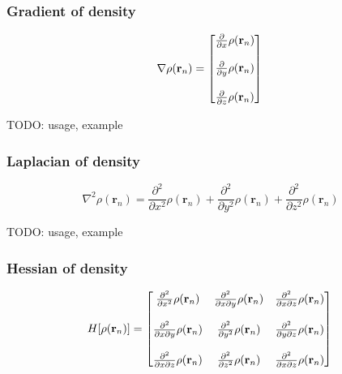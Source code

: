 \documentclass[letterpaper]{article}
\begin{document}
\subsubsection{Gradient of density}
\begin{equation}
  \nabla \rho(\mathbf{r}_n)
  =
  \begin{bmatrix}
    \frac{\partial}{\partial x} \rho(\mathbf{r}_n)\\\\
    \frac{\partial}{\partial y} \rho(\mathbf{r}_n)\\\\
    \frac{\partial}{\partial z} \rho(\mathbf{r}_n)
  \end{bmatrix}\\
\end{equation}

TODO: usage, example
\subsubsection{Laplacian of density}
\begin{equation}
  \nabla^2 \rho(\mathbf{r}_n)
  =
  \frac{\partial^2}{\partial x^2} \rho(\mathbf{r}_n)
  + \frac{\partial^2}{\partial y^2} \rho(\mathbf{r}_n)
  + \frac{\partial^2}{\partial z^2} \rho(\mathbf{r}_n)
\end{equation}

TODO: usage, example
\subsubsection{Hessian of density}
\begin{equation}
  H[\rho(\mathbf{r}_n)]
  =
  \begin{bmatrix}
    \frac{\partial^2}{\partial x^2} \rho(\mathbf{r}_n) &
    \frac{\partial^2}{\partial x \partial y} \rho(\mathbf{r}_n) &
    \frac{\partial^2}{\partial x \partial z} \rho(\mathbf{r}_n)\\\\
    \frac{\partial^2}{\partial x \partial y} \rho(\mathbf{r}_n) &
    \frac{\partial^2}{\partial y^2} \rho(\mathbf{r}_n)&
    \frac{\partial^2}{\partial y \partial z} \rho(\mathbf{r}_n)\\\\
    \frac{\partial^2}{\partial x \partial z} \rho(\mathbf{r}_n) &
    \frac{\partial^2}{\partial z^2} \rho(\mathbf{r}_n)&
    \frac{\partial^2}{\partial x \partial z} \rho(\mathbf{r}_n)\\
  \end{bmatrix}\\
\end{equation}
\end{document}
